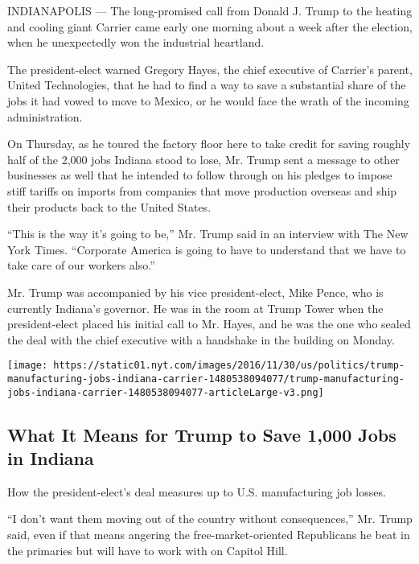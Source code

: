 INDIANAPOLIS --- The long-promised call from Donald J. Trump to the
heating and cooling giant Carrier came early one morning about a week
after the election, when he unexpectedly won the industrial heartland.

The president-elect warned Gregory Hayes, the chief executive of
Carrier's parent, United Technologies, that he had to find a way to save
a substantial share of the jobs it had vowed to move to Mexico, or he
would face the wrath of the incoming administration.

On Thursday, as he toured the factory floor here to take credit for
saving roughly half of the 2,000 jobs Indiana stood to lose, Mr. Trump
sent a message to other businesses as well that he intended to follow
through on his pledges to impose stiff tariffs on imports from companies
that move production overseas and ship their products back to the United
States.

``This is the way it's going to be,'' Mr. Trump said in an interview
with The New York Times. ``Corporate America is going to have to
understand that we have to take care of our workers also.''

Mr. Trump was accompanied by his vice president-elect, Mike Pence, who
is currently Indiana's governor. He was in the room at Trump Tower when
the president-elect placed his initial call to Mr. Hayes, and he was the
one who sealed the deal with the chief executive with a handshake in the
building on Monday.

\href{https://www.nytimes.com/interactive/2016/11/30/us/politics/trump-manufacturing-jobs-indiana-carrier.html}{}

\texttt{[image: https://static01.nyt.com/images/2016/11/30/us/politics/trump-manufacturing-jobs-indiana-carrier-1480538094077/trump-manufacturing-jobs-indiana-carrier-1480538094077-articleLarge-v3.png]}

\hypertarget{what-it-means-for-trump-to-save-1000-jobs-in-indiana}{%
\subsection{What It Means for Trump to Save 1,000 Jobs in
Indiana}\label{what-it-means-for-trump-to-save-1000-jobs-in-indiana}}

How the president-elect's deal measures up to U.S. manufacturing job
losses.

``I don't want them moving out of the country without consequences,''
Mr. Trump said, even if that means angering the free-market-oriented
Republicans he beat in the primaries but will have to work with on
Capitol Hill.

